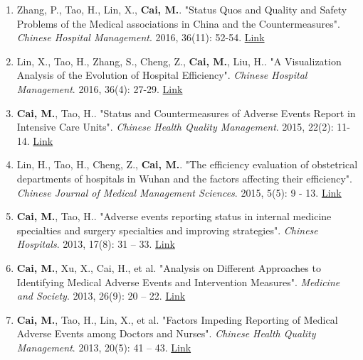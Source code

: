 \documentclass[11pt, a4paper]{article}
\newcommand{\years}[1]{\marginnote{\scriptsize #1}}
\begin{document}
\begin{enumerate}[leftmargin=0ex,itemsep=1ex]
		\item Zhang, P., Tao, H., Lin, X., \textbf{Cai, M.}. "Status Quos and Quality and Safety Problems of the Medical associations in China and the Countermeasures". \emph{Chinese Hospital Management}. 2016, 36(11): 52-54. \href{http://www.cnki.com.cn/Article/CJFDTOTAL-YYGL201611027.htm}{Link}
		
		\item Lin, X., Tao, H., Zhang, S., Cheng, Z., \textbf{Cai, M.}, Liu, H.. "A Visualization Analysis of the Evolution of Hospital Efficiency". \emph{Chinese Hospital Management}. 2016, 36(4): 27-29. \href{http://www.cnki.com.cn/Article/CJFDTOTAL-YYGL201604015.htm}{Link}
		
		\item \years{2016}\textbf{Cai, M.}, Tao, H.. "Status and Countermeasures of Adverse Events Report in Intensive Care Units". \emph{Chinese Health Quality Management}. 2015, 22(2): 11-14. \href{http://www.cnki.com.cn/Article/CJFDTOTAL-WSJG201502008.htm}{Link}
		
		\item \years{2015}Lin, H., Tao, H., Cheng, Z., \textbf{Cai, M.}. "The efficiency evaluation of obstetrical departments of hospitals in Wuhan and the factors affecting their efficiency". \emph{Chinese Journal of Medical Management Sciences}. 2015, 5(5): 9 - 13. \href{http://www.cnki.com.cn/Article/CJFDTOTAL-YLGL201505004.htm}{Link}
		
		\item \years{2013}\textbf{Cai, M.}, Tao, H.. "Adverse events reporting status in internal medicine specialties and surgery specialties and improving strategies". \emph{Chinese Hospitals}. 2013, 17(8): 31 – 33. \href{http://www.cnki.com.cn/Article/CJFDTOTAL-ZGYU201308016.htm}{Link}
		
		\item \textbf{Cai, M.}, Xu, X., Cai, H., et al. "Analysis on Different Approaches to Identifying Medical Adverse Events and Intervention Measures". \emph{Medicine and Society}. 2013, 26(9): 20 – 22. \href{http://www.cnki.com.cn/Article/CJFDTOTAL-YXSH201309007.htm}{Link}
		
		\item \textbf{Cai, M.}, Tao, H., Lin, X., et al. "Factors Impeding Reporting of Medical Adverse Events among Doctors and Nurses". \emph{Chinese Health Quality Management}. 2013, 20(5): 41 – 43. \href{http://www.cqvip.com/qk/98273x/201305/47221843.html}{Link}
	\end{enumerate}
\end{document}
